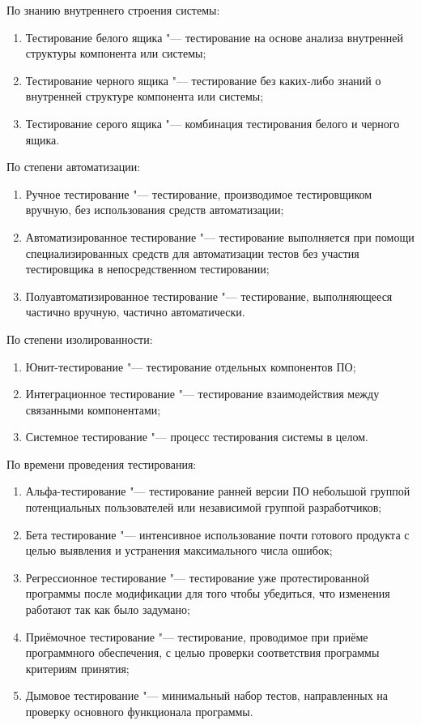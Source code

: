 По знанию внутреннего строения системы:
\begin{enumerate}
  \item Тестирование белого ящика "--- тестирование на основе анализа внутренней структуры компонента или системы;
  \item Тестирование черного ящика "--- тестирование без каких-либо знаний о внутренней структуре компонента или системы;
  \item Тестирование серого ящика "--- комбинация тестирования белого и черного ящика.
\end{enumerate}

По степени автоматизации:
\begin{enumerate}
  \item Ручное тестирование "--- тестирование, производимое тестировщиком вручную, без использования средств автоматизации;
  \item Автоматизированное тестирование "--- тестирование выполняется при помощи специализированных средств для автоматизации тестов без участия тестировщика в непосредственном тестировании;
  \item Полуавтоматизированное тестирование "--- тестирование, выполняющееся частично вручную, частично автоматически.
\end{enumerate}

По степени изолированности:
\begin{enumerate}
  \item Юнит-тестирование "--- тестирование отдельных компонентов ПО;
  \item Интеграционное тестирование "--- тестирование взаимодействия между связанными компонентами;
  \item Системное тестирование "--- процесс тестирования системы в целом.
\end{enumerate}

По времени проведения тестирования:
\begin{enumerate}
  \item Альфа-тестирование "--- тестирование ранней версии ПО небольшой группой потенциальных пользователей или независимой группой разработчиков;
  \item Бета тестирование "--- интенсивное использование почти готового продукта с целью выявления и устранения максимального числа ошибок;
  \item Регрессионное тестирование "--- тестирование уже протестированной программы после модификации для того чтобы убедиться, что изменения работают так как было задумано;
  \item Приёмочное тестирование "--- тестирование, проводимое при приёме программного обеспечения, с целью проверки соответствия программы критериям принятия;
  \item Дымовое тестирование "--- минимальный набор тестов, направленных на проверку основного функционала программы.
\end{enumerate}

